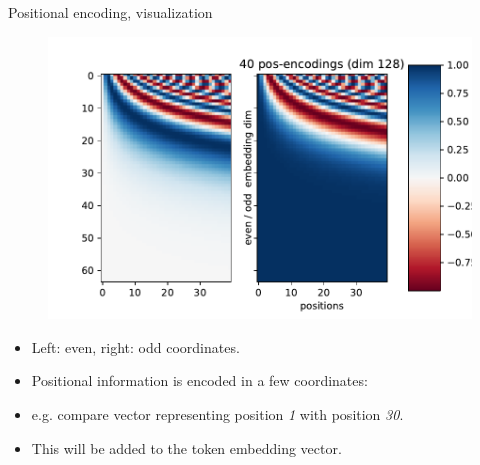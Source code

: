 \begin{frame}{Positional encoding, visualization}
\vspace{-5mm}
\begin{figure}
\centering
\includegraphics[width=.7\linewidth]{./figures/pos_enc.pdf}
\end{figure}
\begin{itemize}
\item Left: even, right: odd coordinates.
\item Positional information is encoded in a few coordinates:
\item e.g. compare vector representing position \textit{1} with position \textit{30}.
\item This will be added to the token embedding vector.
\end{itemize}
\end{frame}


